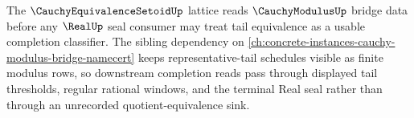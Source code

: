 The $\CauchyEquivalenceSetoidUp$ lattice reads $\CauchyModulusUp$ bridge data before any $\RealUp$ seal consumer may treat tail equivalence as a usable completion classifier. The sibling dependency on \autoref{ch:concrete-instances-cauchy-modulus-bridge-namecert} keeps representative-tail schedules visible as finite modulus rows, so downstream completion reads pass through displayed tail thresholds, regular rational windows, and the terminal Real seal rather than through an unrecorded quotient-equivalence sink.

